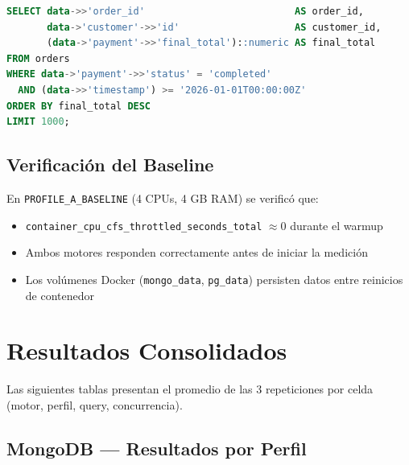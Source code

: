 \documentclass[12pt,a4paper]{article}
\newcommand{\profileA}{\texttt{PROFILE\_A\_BASELINE}}
\begin{document}
\begin{lstlisting}[language=SQL, caption={Q2 — PostgreSQL JSONB: Sort + Limit}]
SELECT data->>'order_id'                          AS order_id,
       data->'customer'->>'id'                    AS customer_id,
       (data->'payment'->>'final_total')::numeric AS final_total
FROM orders
WHERE data->'payment'->>'status' = 'completed'
  AND (data->>'timestamp') >= '2026-01-01T00:00:00Z'
ORDER BY final_total DESC
LIMIT 1000;
\end{lstlisting}

\subsection{Verificación del Baseline}

En \profileA{} (4 CPUs, 4 GB RAM) se verificó que:
\begin{itemize}
  \item \texttt{container\_cpu\_cfs\_throttled\_seconds\_total} $\approx 0$ durante el warmup
  \item Ambos motores responden correctamente antes de iniciar la medición
  \item Los volúmenes Docker (\texttt{mongo\_data}, \texttt{pg\_data}) persisten datos entre reinicios de contenedor
\end{itemize}

\section{Resultados Consolidados}

Las siguientes tablas presentan el promedio de las 3 repeticiones por celda (motor, perfil, query, concurrencia).

\subsection{MongoDB — Resultados por Perfil}
\end{document}
